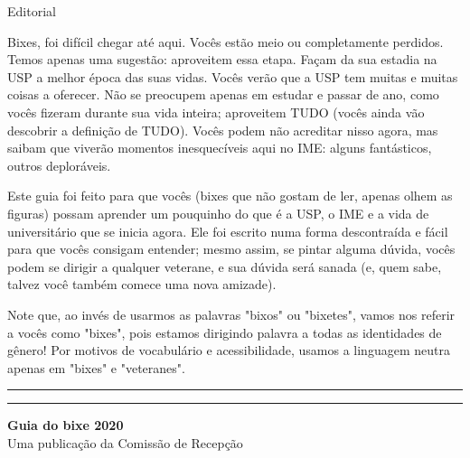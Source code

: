 \begin{editorial}{Editorial}

Bixes, foi difícil chegar até aqui. Vocês
estão meio ou completamente perdidos. Temos apenas uma sugestão: aproveitem essa
etapa.  Façam da sua estadia na USP a melhor época das suas vidas. Vocês verão
que a USP tem muitas e muitas coisas a oferecer. Não se preocupem apenas em
estudar e passar de ano, como vocês fizeram durante sua vida inteira; aproveitem
TUDO (vocês ainda vão descobrir a definição de TUDO). Vocês podem não acreditar
nisso agora, mas saibam que viverão momentos inesquecíveis aqui no IME: alguns
fantásticos, outros deploráveis.

Este guia foi feito para que vocês (bixes que não gostam de ler, apenas olhem as figuras)
possam aprender um pouquinho do que é a USP,
o IME e a vida de universitário que se inicia agora. Ele foi escrito numa forma
descontraída e fácil para que vocês consigam entender; mesmo assim, se pintar
alguma dúvida, vocês podem se dirigir a qualquer veterane, e sua dúvida será
sanada (e, quem sabe, talvez você também comece uma nova amizade).

Note que, ao invés de usarmos as palavras "bixos" ou "bixetes", vamos nos referir
a vocês como "bixes", pois estamos dirigindo palavra a todas as identidades de 
gênero! Por motivos de vocabulário e acessibilidade, usamos a linguagem neutra 
apenas em "bixes" e "veteranes".


\rule{\textwidth}{0.5ex}\rule{2ex}{0.5ex}

{\large\bf Guia do bixe 2020} \\
Uma publicação da Comissão de Recepção


\end{editorial}

